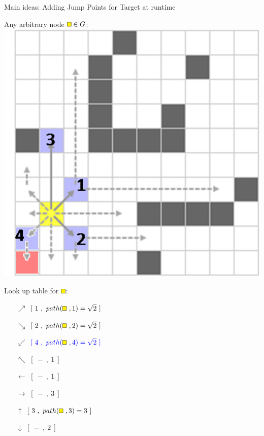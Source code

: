 \documentclass{presentation}
\begin{document}
\begin{frame}{Main ideas: Adding Jump Points for Target at runtime}
 	\begin{minipage}{0.45\textwidth}
		Any arbitrary node $\tikz{\path[draw=black,fill=yellow] (0,0) rectangle (2mm,2mm);}\in G$:\\
		\vspace{3mm}
		\includegraphics[width=\textwidth]{figures/jps_geschnitten/1(yellow3).png}
	\end{minipage}%
	\hfill%
	\begin{minipage}{0.45\textwidth}
		Look up table for $\tikz{\path[draw=black,fill=yellow] (0,0) rectangle (2mm,2mm);}$:\\
		\vspace{3mm}
		\begin{itemize}
		\item[$\nearrow$] $[\ 1\ ,\ path(\tikz{\path[draw=black,fill=yellow] (0,0) rectangle (2mm,2mm);}\ ,1)=\sqrt{2}\ ]$
		\item[$\searrow$] $[\ 2\ ,\ path(\tikz{\path[draw=black,fill=yellow] (0,0) rectangle (2mm,2mm);}\ ,2)=\sqrt{2}\ ]$
		\item[$\swarrow$] $\color{blue}[\ 4\ ,\ path(\tikz{\path[draw=black,fill=yellow] (0,0) rectangle (2mm,2mm);}\ ,4)=\sqrt{2}\ ]$
		\item[$\nwarrow$] $[\ -\ ,\ 1\ ]$
		\item[$\leftarrow$] $[\ -\ ,\ 1\ ]$
		\item[$\rightarrow$] $[\ -\ ,\ 3\ ]$
		\item[$\uparrow$] $[\ 3\ ,\ path(\tikz{\path[draw=black,fill=yellow] (0,0) rectangle (2mm,2mm);}\ ,3)=3\ ]$
		\item[$\downarrow$] $[\ -\ ,\ 2\ ]$
		\end{itemize}
	\end{minipage}
\end{frame}
\end{document}
